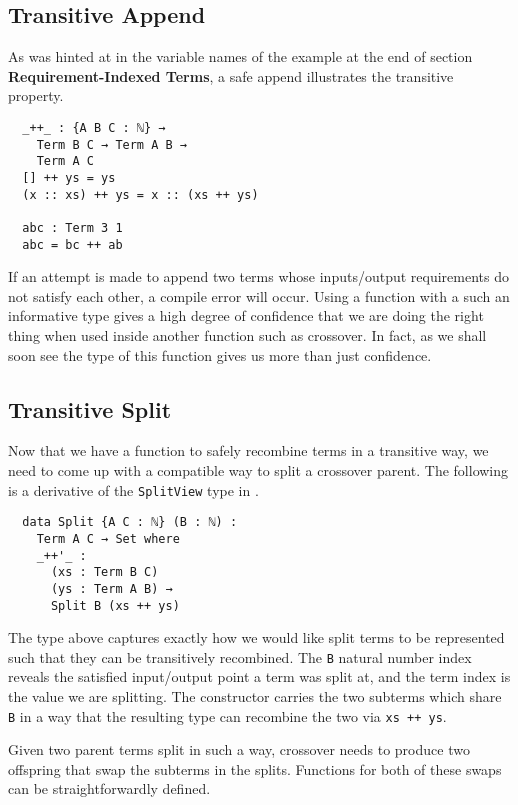 \documentclass{acm_proc_article-sp}
\begin{document}
\subsection{Transitive Append}

As was hinted at in the variable names of the example at the end of
section \textbf{Requirement-Indexed Terms}, a safe append illustrates
the transitive property. 

\begin{verbatim}
  _++_ : {A B C : ℕ} →
    Term B C → Term A B →
    Term A C
  [] ++ ys = ys
  (x :: xs) ++ ys = x :: (xs ++ ys)

  abc : Term 3 1
  abc = bc ++ ab
\end{verbatim}

If an attempt is made to append two terms whose inputs/output
requirements do not satisfy each other, a compile error will
occur. Using a function with a such an informative type gives a high
degree of confidence that we are doing the right thing when used
inside another function such as crossover. In fact, as we shall soon
see the type of this function gives us more than just confidence.

\subsection{Transitive Split}

Now that we have a function to safely recombine terms in a transitive
way, we need to come up with a compatible way to split a crossover
parent. The following is a derivative of the \texttt{SplitView} type
in \cite{oury:tpop}.

\begin{verbatim}
  data Split {A C : ℕ} (B : ℕ) :
    Term A C → Set where
    _++'_ :
      (xs : Term B C)
      (ys : Term A B) →
      Split B (xs ++ ys)
\end{verbatim}

The type above captures exactly how we would like split terms to be
represented such that they can be transitively recombined. The
\texttt{B} natural number index reveals the satisfied
input/output point a term was split at, and the term index is the
value we are splitting. The constructor carries the two
subterms which share \texttt{B} in a way that the resulting type can
recombine the two via \texttt{xs ++ ys}.

Given two parent terms split in such a way, crossover needs to produce
two offspring that swap the subterms in the splits. Functions for both
of these swaps can be straightforwardly defined.
\end{document}
